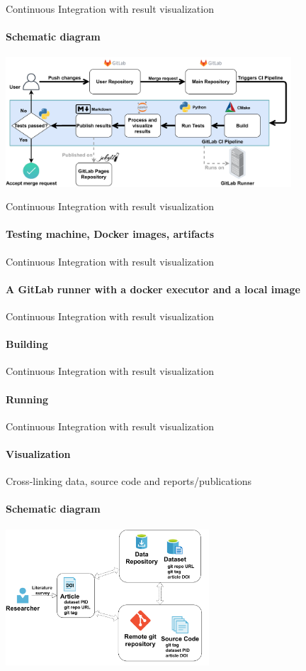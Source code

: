 \documentclass[
	ngerman,%
	aspectratio=169,%
	color={accentcolor=2d},
	logo=true,%
	colorframetitle=true,%
	]{tudabeamer}
\begin{document}
\begin{frame}{Continuous Integration with result visualization} 
	\framesubtitle{Schematic diagram}

	\centering
	\includegraphics[width=0.8\textwidth]{figures/ZINF-CI-diagram.pdf}

\end{frame}

\begin{frame}{Continuous Integration with result visualization} 
    \framesubtitle{Testing machine, Docker images, artifacts}

\end{frame}

\begin{frame}{Continuous Integration with result visualization} 
    \framesubtitle{A GitLab runner with a docker executor and a local image}

\end{frame}

\begin{frame}{Continuous Integration with result visualization} 
    \framesubtitle{Building}

\end{frame}

\begin{frame}{Continuous Integration with result visualization} 
    \framesubtitle{Running}

\end{frame}

\begin{frame}{Continuous Integration with result visualization} 
    \framesubtitle{Visualization}

\end{frame}

\begin{frame}{Cross-linking data, source code and reports/publications} 
	\framesubtitle{Schematic diagram}
	
	\begin{center}
		\includegraphics[width=0.57\textwidth]{figures/cross-linking.pdf}
	\end{center}

\end{frame}
\end{document}
